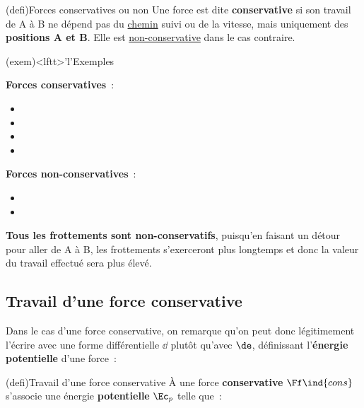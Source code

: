 \documentclass[../../main/main.tex]{subfiles}
\begin{document}
\begin{tcb*}(defi){Forces conservatives ou non}
	Une force est dite \textbf{conservative} si son travail de A à B ne dépend pas du
	\underline{chemin} suivi ou de la vitesse, mais uniquement des
	\textbf{positions A et B}. Elle est \underline{non-conservative} dans le cas
	contraire.
\end{tcb*}

\begin{tcb*}(exem)<lftt>'l'{Exemples}
	\begin{minipage}{0.45\linewidth}
		\textbf{Forces conservatives}~:
		\begin{itemize}
			\item {}
			\item {}
			\item {}
			\item {}
		\end{itemize}
	\end{minipage}
	\hfill
	\begin{minipage}[b]{0.45\linewidth}
		\textbf{Forces non-conservatives}~:
		\begin{itemize}
			\item {}
			\item {}
		\end{itemize}
	\end{minipage}
	\bigbreak
	\textbf{Tous les frottements sont non-conservatifs}, puisqu'en faisant un
	détour pour aller de A à B, les frottements s'exerceront plus longtemps et
	donc la valeur du travail effectué sera plus élevé.
\end{tcb*}

\subsection{Travail d'une force conservative}
Dans le cas d'une force conservative, on remarque qu'on peut donc légitimement
l'écrire avec une forme différentielle $\dd$ plutôt qu'avec $\de$, définissant
l'\textbf{énergie potentielle} d'une force~:

\begin{tcb*}(defi){Travail d'une force conservative}
	À une force \textbf{conservative} $\Ff\ind{cons}$ s'associe une énergie
	\textbf{potentielle} $\Ec_p$ telle que~:
	\vspace{-15pt}
\end{tcb*}
\end{document}
